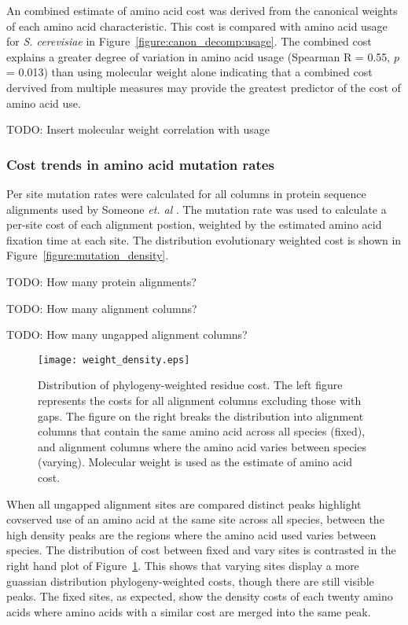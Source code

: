 An combined estimate of amino acid cost was derived from the canonical weights of each amino acid characteristic. This cost is compared with amino acid usage for \emph{S. cerevisiae} in Figure~\ref{figure:canon_decomp:usage}. The combined cost explains a greater degree of variation in amino acid usage (Spearman R = 0.55, $p$ = 0.013) than using molecular weight alone indicating that a combined cost dervived from multiple measures may provide the greatest predictor of the cost of amino acid use.

TODO: Insert molecular weight correlation with usage

\subsubsection{Cost trends in amino acid mutation rates}

Per site mutation rates were calculated for all columns in protein sequence alignments used by Someone \emph{et. al} \cite{wall2005}. The mutation rate was used to calculate a per-site cost of each alignment postion, weighted by the estimated amino acid fixation time at each site. The distribution evolutionary weighted cost is shown in Figure~\vref{figure:mutation_density}.

TODO: How many protein alignments?

TODO: How many alignment columns?

TODO: How many ungapped alignment columns?

\begin{figure}
  \centering
  \texttt{[image: weight\_density.eps]}
  \caption[Distribution of phylogeny-weighted residue cost.]{Distribution of phylogeny-weighted residue cost. The left figure represents the costs for all alignment columns excluding those with gaps. The figure on the right breaks the distribution into alignment columns that contain the same amino acid across all species (fixed), and alignment columns where the amino acid varies between species (varying). Molecular weight is used as the estimate of amino acid cost.}
  \label{figure:mutation_density}
\end{figure}

When all ungapped alignment sites are compared distinct peaks highlight covserved use of an amino acid at the same site across all species, between the high density peaks are the regions where the amino acid used varies between species. The distribution of cost between fixed and vary sites is contrasted in the right hand plot of Figure~\ref{figure:mutation_density}. This shows that varying sites display a more guassian distribution phylogeny-weighted costs, though there are still visible peaks. The fixed sites, as expected, show the density costs of each twenty amino acids where amino acids with a similar cost are merged into the same peak.


